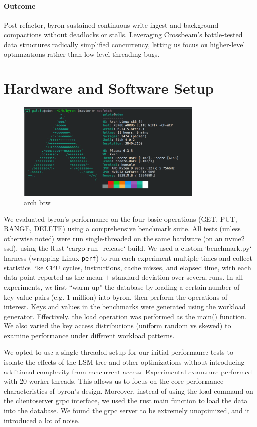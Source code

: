 \documentclass[10pt]{article}
\begin{document}
\paragraph{Outcome}
Post-refactor, byron sustained continuous write ingest and background compactions without deadlocks or stalls. Leveraging Crossbeam’s battle-tested data structures radically simplified concurrency, letting us focus on higher-level optimizations rather than low-level threading bugs.


\section{Hardware and Software Setup}
\begin{figure}[htbp]
  \centering
  \includegraphics[width=0.8\textwidth]{neofetch.png}
  \caption{arch btw}
  \label{fig:neofetch}
\end{figure}

We evaluated byron’s performance on the four basic operations (GET, PUT, RANGE, DELETE) using a comprehensive benchmark suite. All tests (unless otherwise noted) were run single-threaded on the same hardware (on an nvme2 ssd), using the Rust `cargo run --release` build. We used a custom `benchmark.py` harness (wrapping Linux \texttt{perf}) to run each experiment multiple times and collect statistics like CPU cycles, instructions, cache misses, and elapsed time, with each data point reported as the mean $\pm$ standard deviation over several runs. In all experiments, we first “warm up” the database by loading a certain number of key-value pairs (e.g. 1 million) into byron, then perform the operations of interest. Keys and values in the benchmarks were generated using the workload generator. Effectively, the load operation was performed as the main() function. We also varied the key access distributions (uniform random vs skewed) to examine performance under different workload patterns.

We opted to use a single-threaded setup for our initial performance tests to isolate the effects of the LSM tree and other optimizations without introducing additional complexity from concurrent access. Experimental exams are performed with 20 worker threads. This allows us to focus on the core performance characteristics of byron’s design.
Moreover, instead of using the load command on the clientoserver grpc interface, we used the rust main function to load the data into the database. We found the grpc server to be extremely unoptimized, and it introduced a lot of noise.
\end{document}
